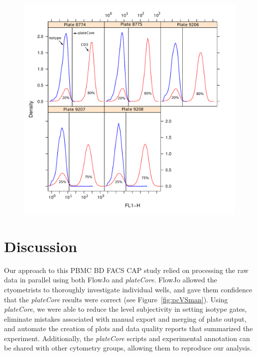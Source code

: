 \documentclass[12pt]{article}
\newcommand{\Rpackage}[1]{{\textit{#1}}}
\begin{document}
\begin{figure}
\centering
\includegraphics{mfiRatio2.pdf}
\caption{}
\label{fig:mfiRatio3}
\end{figure}

\clearpage
\section*{Discussion}

Our approach to this PBMC BD FACS CAP study relied on processing the raw data
in parallel using both FlowJo and \Rpackage{plateCore}. FlowJo allowed the
ctyometrists to thoroughly investigate individual wells, and gave them
confidence that the \Rpackage{plateCore} results were correct (see
Figure~\ref{fig:pcVSman}). Using \Rpackage{plateCore}, we were able to reduce
the level subjectivity in setting isotype gates, eliminate mistakes associated
with manual export and merging of plate output, and automate the creation of
plots and data quality reports that summarized the experiment. Additionally,
the \Rpackage{plateCore} scripts and experimental annotation can be shared with
other cytometry groups, allowing them to reproduce our analysis.
\end{document}
